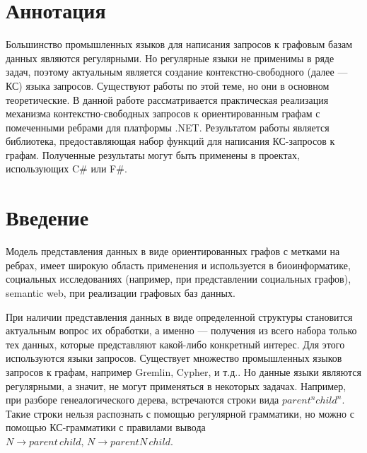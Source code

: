 \documentclass[14pt]{matmex-diploma-custom}
\begin{document}
\maketitle
\tableofcontents
\section*{Аннотация}
	Большинство промышленных языков для написания запросов к графовым базам данных являются регулярными. Но регулярные языки не применимы в ряде задач, поэтому актуальным является создание контекстно-свободного (далее --- КС) языка запросов. Существуют работы по этой теме, но они в основном теоретические. В данной работе рассматривается практическая реализация механизма контекстно-свободных запросов к ориентированным графам с помеченными ребрами для платформы .NET. Результатом работы является библиотека, предоставляющая набор функций для написания КС-запросов к графам. Полученные результаты могут быть применены в проектах, использующих C\# или F\#.

\section*{Введение}
	Модель представления данных в виде ориентированных графов с метками на ребрах, имеет широкую область применения и используется в биоинформатике, социальных исследованиях (например, при представлении социальных графов), semantic web, при реализации графовых баз данных. 
	
	При наличии представления данных в виде определенной структуры становится актуальным вопрос их обработки, а именно --- получения из всего набора только тех данных, которые представляют какой-либо конкретный интерес. Для этого используются языки запросов. Существует множество промышленных языков запросов к графам, например Gremlin\cite{Gremlin}, Cypher\cite{Cypher}, и т.д.. Но данные языки являются регулярными, а значит, не могут применяться в некоторых задачах. Например, при разборе генеалогического дерева, встречаются строки вида \(parent^nchild^n\). Такие строки нельзя распознать с помощью регулярной грамматики, но можно с помощью КС-грамматики с правилами вывода \(N \to parent\,child, \,N \to parentN\, child\). 
	
\end{document}
